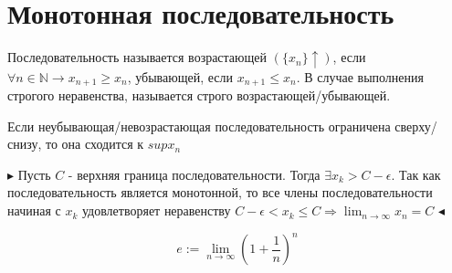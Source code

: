 \documentclass[14pt]{extreport}
\begin{document}
            \section{Монотонная последовательность}

            \begin{definition}
                Последовательность называется возрастающей $(\{x_n\} \uparrow)$, если $\forall n \in \mathbb{N} \rightarrow x_{n+1} \geq x_n$, убывающей, если $x_{n+1} \leq x_n$. В случае выполнения строгого неравенства, называется строго возрастающей/убывающей.
            \end{definition}

            \begin{theorem}[Вейерштрасса]
                    Если неубывающая/невозрастающая последовательность ограничена сверху/снизу, то она сходится к $sup x_n$
            \end{theorem}
            $\blacktriangleright$ 
                Пусть $C$ - верхняя граница последовательности. Тогда $\exists x_k > C-\epsilon$. Так как последовательность является монотонной, то все члены последовательности начиная с $x_k$ удовлетворяет неравенству $C-\epsilon < x_k \leq C \Rightarrow \lim_{n\rightarrow\infty} x_n = C$
            $\blacktriangleleft$  
            
            \begin{definition}
                \begin{equation}
                    e:= \lim_{n\rightarrow\infty} (1 + \frac{1}{n})^n
                \end{equation}
            \end{definition}
\end{document}
